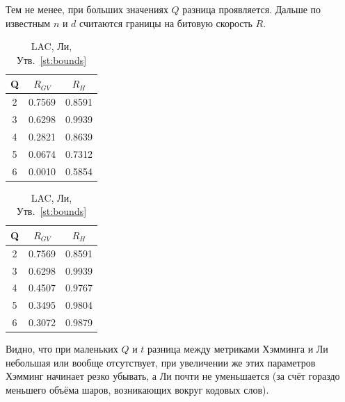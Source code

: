 Тем не менее, при больших значениях $Q$ разница проявляется. Дальше по известным $n$ и $d$ считаются границы на битовую скорость $R$.

\begin{table}[h]
	\centering
	\begin{minipage}{0.48\textwidth}
		\caption{LAC, Хэмминг, Утв.~\ref{st:bounds}}
		\centering
		\label{tab:LAC,Ham}
		\begin{tabular}{|c|c|c|}
			\hline Q & $R_{GV}$ & $R_H$ \\ \hline
			2 & 0.7569 & 0.8591 \\ \hline
			3 & 0.6298 & 0.9939 \\ \hline
			4 & 0.2821 & 0.8639 \\ \hline
			5 & 0.0674 & 0.7312 \\ \hline
			6 & 0.0010 & 0.5854 \\ \hline
		\end{tabular}
	\end{minipage}
	\hfill
	\begin{minipage}{0.48\textwidth}
		\caption{LAC, Ли, Утв.~\ref{st:bounds}}
		\centering
		\label{tab:LAC,Li}
		\begin{tabular}{|c|c|c|}
			\hline Q & $R_{GV}$ & $R_H$ \\ \hline
			2 & 0.7569 & 0.8591 \\ \hline
			3 & 0.6298 & 0.9939 \\ \hline
			4 & 0.4507 & 0.9767 \\ \hline
			5 & 0.3495 & 0.9804 \\ \hline
			6 & 0.3072 & 0.9879 \\ \hline
		\end{tabular}
	\end{minipage}
\end{table}

Видно, что при маленьких $Q$ и $t$ разница между метриками Хэмминга и Ли небольшая или вообще отсутствует, при увеличении же этих параметров Хэмминг начинает резко убывать, а Ли почти не уменьшается (за счёт гораздо меньшего объёма шаров, возникающих вокруг кодовых слов).

